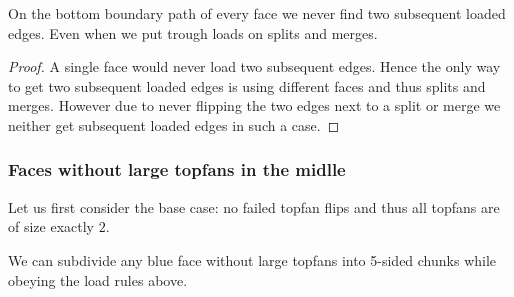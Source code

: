 \begin{lemma}
  \label{lm:}
  On the bottom boundary path of every face we never find two subsequent loaded edges. Even when we put trough loads on splits and merges.
\end{lemma}
\begin{proof}
  A single face would never load two subsequent edges. Hence the only way to get two subsequent loaded edges is using different faces and thus splits and merges.
  However due to never flipping the two edges next to a split or merge we neither get subsequent loaded edges in such a case.
\end{proof}


\subsubsection{Faces without large topfans in the midlle}
Let us first consider the base case: no failed topfan flips and thus all topfans are of size exactly $2$.

\begin{lemma}
  \label{lm:subdiv:withoutTopfan}
  We can subdivide any blue face without large topfans into 5-sided chunks while obeying the load rules above.
\end{lemma}

